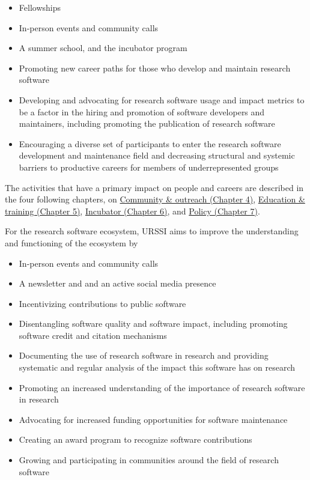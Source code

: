 \documentclass[
]{book}
\begin{document}
\begin{itemize}
\item
  Fellowships
\item
  In-person events and community calls
\item
  A summer school, and the incubator program
\item
  Promoting new career paths for those who develop and maintain research software
\item
  Developing and advocating for research software usage and impact metrics to be
  a factor in the hiring and promotion of software developers and maintainers,
  including promoting the publication of research software
\item
  Encouraging a diverse set of participants to enter the research software
  development and maintenance field and decreasing structural and systemic
  barriers to productive careers for members of underrepresented groups
\end{itemize}

The activities that have a primary impact on people and careers are described in
the four following chapters, on
\href{Ch-Comm}{Community \& outreach (Chapter 4)},
\href{Ch-Edu}{Education \& training (Chapter 5)},
\href{Ch-Incubator}{Incubator (Chapter 6)}, and
\href{Ch-Policy}{Policy (Chapter 7)}.

For the research software ecosystem, URSSI aims to improve the understanding and functioning of the ecosystem by

\begin{itemize}
\item
  In-person events and community calls
\item
  A newsletter and and an active social media presence
\item
  Incentivizing contributions to public software
\item
  Disentangling software quality and software impact, including
  promoting software credit and citation mechanisms
\item
  Documenting the use of research software in research and providing
  systematic and regular analysis of the impact this software has on research
\item
  Promoting an increased understanding of the importance of research software in research
\item
  Advocating for increased funding opportunities for software maintenance
\item
  Creating an award program to recognize software contributions
\item
  Growing and participating in communities around the field of research software
\end{itemize}
\end{document}
